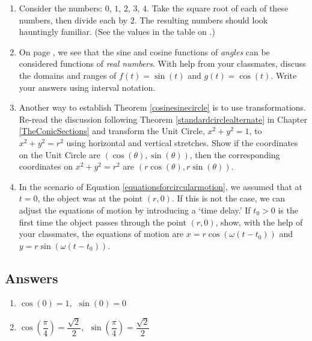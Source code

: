 \begin{enumerate}

\setcounter{enumi}{\value{HW}}

\item Consider the numbers:  $0$, $1$, $2$, $3$, $4$.  Take the square root of each of these numbers, then divide each by $2$. The resulting numbers should look hauntingly familiar. (See the values in the table on \pageref{CosineSineFacts}.) 


\item  On page \pageref{cosinesineequationsrealnumbers}, we see that the sine and cosine functions of \textit{angles} can be considered functions of \textit{real numbers}.  With help from your classmates, discuss the domains and ranges of  $f(t) = \sin(t)$ and $g(t) = \cos(t)$.  Write your answers using interval notation.


\item  \label{circleofradiusrsinecosinetrans}  Another way to establish  Theorem \ref{cosinesinecircle} is to use transformations. Re-read the discussion following  Theorem \ref{standardcirclealternate} in Chapter \ref{TheConicSections}  and transform  the Unit Circle, $x^2+y^2 = 1$, to $x^2 + y^2 = r^2$ using horizontal and vertical stretches.  Show if the coordinates on the Unit Circle are $(\cos(\theta), \sin(\theta))$, then the corresponding coordinates on $x^2+y^2 = r^2$ are $(r \cos(\theta), r \sin(\theta))$.

\item  In the scenario of Equation \ref{equationsforcircularmotion}, we assumed that at $t=0$, the object was at the point $(r,0)$.  If this is not the case,  we can adjust the equations of motion by introducing a `time delay.'   If $t_{0} > 0$ is the first time the object passes through the point $(r,0)$, show, with the help of your classmates, the equations of motion are $x = r \cos(\omega (t - t_{0}))$ and $y = r \sin(\omega (t-t_{0}))$.


\end{enumerate}

\newpage

\subsection{Answers}

\begin{multicols}{2}

\begin{enumerate}

\item $\cos(0) = 1$, $\; \sin(0) = 0$ 

\item $\cos \left(\dfrac{\pi}{4} \right) = \dfrac{\sqrt{2}}{2}$, $\; \sin \left(\dfrac{\pi}{4} \right) = \dfrac{\sqrt{2}}{2}$

\setcounter{HW}{\value{enumi}}

\end{enumerate}

\end{multicols}


